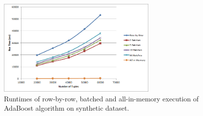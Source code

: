 \begin{figure}[ht]
\centering
\includegraphics[height=180px]{ada3.png}
\caption{Runtimes of row-by-row, batched and all-in-memory execution of AdaBoost algorithm on synthetic dataset.}
\label{fig:adabatch2}
\end{figure}

